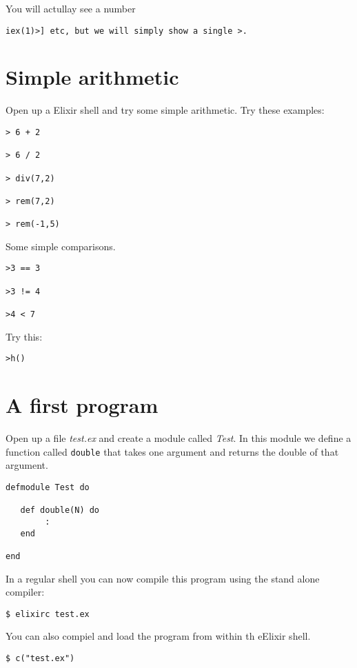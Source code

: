 \documentclass[a4paper,11pt]{article}
\begin{document}
You will actullay see a number {\tt iex(1)>] etc, but we will simply
  show a single {\tt >}.

\section{Simple arithmetic}

Open up a Elixir shell and try some simple arithmetic. Try these examples:

\begin{verbatim}
> 6 + 2

> 6 / 2

> div(7,2)

> rem(7,2)

> rem(-1,5)

\end{verbatim}

Some simple comparisons.

\begin{verbatim}
>3 == 3

>3 != 4

>4 < 7
\end{verbatim}

Try this:
\begin{verbatim}
>h()
\end{verbatim}


\section{A first program}

Open up a file {\em test.ex} and create a module called {\em Test}. In
this module we define a function called {\tt double} that takes one
argument and returns the double of that argument. 

\begin{verbatim}
defmodule Test do

   def double(N) do
        :
   end   

end
\end{verbatim}

In a regular shell you can now compile this program using the stand alone compiler:

\begin{verbatim}
$ elixirc test.ex
\end{verbatim}

You can also compiel and load the program from within th eElixir shell.

\begin{verbatim}
$ c("test.ex")
\end{verbatim}

}
\end{document}
